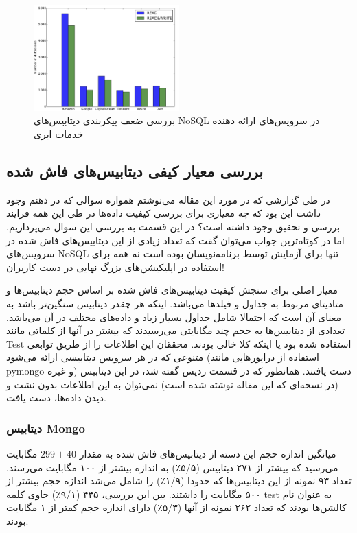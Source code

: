 \documentclass[10pt, a4paper]{article}
\begin{document}
\begin{figure}
    \centering
    \includegraphics[width=0.5\textwidth]{res/b.png}
    \caption{بررسی ضعف پیکربندی دیتابیس‌های NoSQL در سرویس‌های ارائه دهنده خدمات ابری}
    \label{fig: diagram}
\end{figure}

\subsection{بررسی معیار کیفی دیتابیس‌های فاش شده}

در طی گزارشی که در مورد این مقاله می‌نوشتم همواره سوالی که در ذهنم وجود داشت این
بود که چه معیاری برای بررسی کیفیت داده‌ها در طی این همه فرایند بررسی و تحقیق
وجود داشته است؟ در این قسمت به بررسی این سوال می‌پردازیم. اما در کوتاه‌ترین جواب
می‌توان گفت که تعداد زیادی از این دیتابیس‌های فاش شده در سرویس‌های NoSQL تنها
برای آزمایش توسط برنامه‌نویسان بوده است نه همه برای استفاده در اپلیکیشن‌های بزرگ
نهایی در دست کاربران!

معیار اصلی برای سنجش کیفیت دیتابیس‌های فاش شده بر اساس حجم دیتابیس‌ها و متادیتای
مربوط به جداول و فیلد‌ها می‌باشد. اینکه هر چقدر دیتابیس سنگین‌تر باشد به معنای
آن است که احتمالا شامل جداول بسیار زیاد و داده‌های مختلف در آن می‌باشد. تعدادی
از دیتابیس‌ها به حجم چند مگابایتی می‌رسیدند که بیشتر در آنها از کلماتی مانند
Test استفاده شده بود یا اینکه کلا خالی بودند. محققان این اطلاعات را از طریق
توابعی متنوعی که در هر سرویس دیتابیسی ارائه می‌شود (استفاده از درایور‌هایی مانند
pymongo و غیره) دست یافتند. همانطور که در قسمت ردیس گفته شد، در این دیتابیس (در
نسخه‌ای که این مقاله نوشته شده است) نمی‌توان به این اطلاعات بدون نشت و دیدن
داده‌ها، دست یافت.

\subsubsection{دیتابیس Mongo}

میانگین اندازه حجم این دسته از دیتابیس‌های فاش شده به مقدار $ 299 \pm 40 $
مگابایت می‌رسید که بیشتر از ۲۷۱ دیتابیس (۵/۵٪) به اندازه بیشتر از ۱۰۰ مگابایت
می‌رسند.  تعداد ۹۳ نمونه از این دیتابیس‌ها که حدودا (۱/۹٪) را شامل می‌شد اندازه
حجم بیشتر از ۵۰۰ مگابایت را داشتند. بین این بررسی، ۴۴۵ (۹/۱٪) حاوی کلمه test به
عنوان نام کالشن‌ها بودند که تعداد ۲۶۲ نمونه از آنها (۵/۳٪) دارای اندازه حجم کمتر
از ۱ مگابایت بودند.
\end{document}
